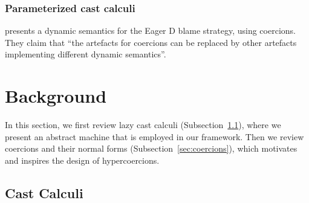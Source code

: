 \documentclass[runningheads]{llncs}
\begin{document}

\subsubsection{Parameterized cast calculi}

\citet{garcia2014deriving} presents a dynamic semantics for the Eager
D blame strategy, using coercions. They claim that ``the artefacts for
coercions can be replaced by other artefacts implementing different
dynamic semantics''.



\section{Background} \label{sec:background}

In this section, we first review lazy cast calculi (Subsection~\ref{sec:cast-calculi}), where
we present an abstract machine that is employed in our framework. Then
we review coercions and their normal forms (Subsection~\ref{sec:coercions}), which
motivates and inspires the design of hypercoercions.

\subsection{Cast Calculi} \label{sec:cast-calculi}
\end{document}
